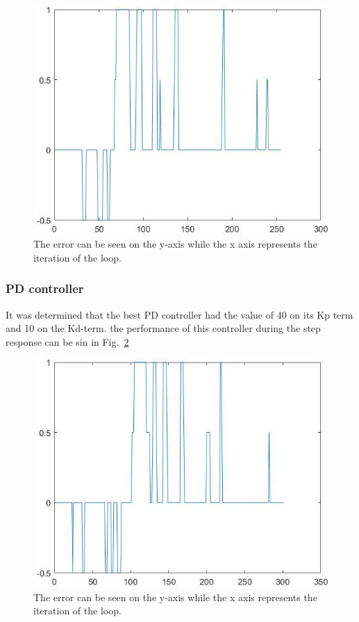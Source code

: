 \begin{figure}[h]
    \centering
    \includegraphics[width=\linewidth]{sections/assets/Kp40.jpg}
    \caption{The error can be seen on the y-axis while the x axis represents the iteration of the loop.}
    \label{Kp40}
\end{figure}

\subsubsection{PD controller}
It was determined that the best PD controller had the value of 40 on its Kp term and 10 on the Kd-term. the performance of this controller during the step response can be sin in Fig.~\ref{Kp40_10Kd}

\begin{figure}[h]
    \centering
    \includegraphics[width=\linewidth]{sections/assets/Kp40_10Kd.jpg}
    \caption{The error can be seen on the y-axis while the x axis represents the iteration of the loop.}
    \label{Kp40_10Kd}
\end{figure}

